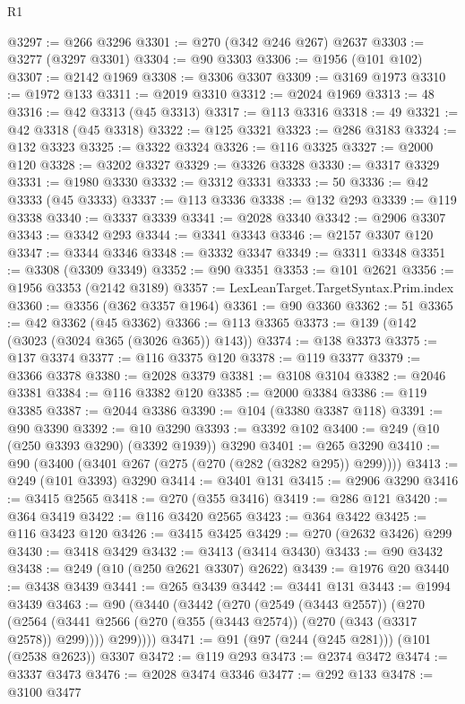 \begin{lexlean}{R1}
\begin{coremodule}
@3297 := @266 @3296
@3301 := @270 (@342 @246 @267) @2637
@3303 := @3277 (@3297 @3301)
@3304 := @90 @3303
@3306 := @1956 (@101 @102)
@3307 := @2142 @1969
@3308 := @3306 @3307
@3309 := @3169 @1973
@3310 := @1972 @133
@3311 := @2019 @3310
@3312 := @2024 @1969
@3313 := 48
@3316 := @42 @3313 (@45 @3313)
@3317 := @113 @3316
@3318 := 49
@3321 := @42 @3318 (@45 @3318)
@3322 := @125 @3321
@3323 := @286 @3183
@3324 := @132 @3323
@3325 := @3322 @3324
@3326 := @116 @3325
@3327 := @2000 @120
@3328 := @3202 @3327
@3329 := @3326 @3328
@3330 := @3317 @3329
@3331 := @1980 @3330
@3332 := @3312 @3331
@3333 := 50
@3336 := @42 @3333 (@45 @3333)
@3337 := @113 @3336
@3338 := @132 @293
@3339 := @119 @3338
@3340 := @3337 @3339
@3341 := @2028 @3340
@3342 := @2906 @3307
@3343 := @3342 @293
@3344 := @3341 @3343
@3346 := @2157 @3307 @120
@3347 := @3344 @3346
@3348 := @3332 @3347
@3349 := @3311 @3348
@3351 := @3308 (@3309 @3349)
@3352 := @90 @3351
@3353 := @101 @2621
@3356 := @1956 @3353 (@2142 @3189)
@3357 := LexLeanTarget.TargetSyntax.Prim.index
@3360 := @3356 (@362 @3357 @1964)
@3361 := @90 @3360
@3362 := 51
@3365 := @42 @3362 (@45 @3362)
@3366 := @113 @3365
@3373 := @139 (@142 (@3023 (@3024 @365 (@3026 @365)) @143))
@3374 := @138 @3373
@3375 := @137 @3374
@3377 := @116 @3375 @120
@3378 := @119 @3377
@3379 := @3366 @3378
@3380 := @2028 @3379
@3381 := @3108 @3104
@3382 := @2046 @3381
@3384 := @116 @3382 @120
@3385 := @2000 @3384
@3386 := @119 @3385
@3387 := @2044 @3386
@3390 := @104 (@3380 @3387 @118)
@3391 := @90 @3390
@3392 := @10 @3290
@3393 := @3392 @102
@3400 := @249 (@10 (@250 @3393 @3290) (@3392 @1939)) @3290
@3401 := @265 @3290
@3410 := @90 (@3400 (@3401 @267 (@275 (@270 (@282 (@3282 @295)) @299))))
@3413 := @249 (@101 @3393) @3290
@3414 := @3401 @131
@3415 := @2906 @3290
@3416 := @3415 @2565
@3418 := @270 (@355 @3416)
@3419 := @286 @121
@3420 := @364 @3419
@3422 := @116 @3420 @2565
@3423 := @364 @3422
@3425 := @116 @3423 @120
@3426 := @3415 @3425
@3429 := @270 (@2632 @3426) @299
@3430 := @3418 @3429
@3432 := @3413 (@3414 @3430)
@3433 := @90 @3432
@3438 := @249 (@10 (@250 @2621 @3307) @2622)
@3439 := @1976 @20
@3440 := @3438 @3439
@3441 := @265 @3439
@3442 := @3441 @131
@3443 := @1994 @3439
@3463 := @90
    (@3440
      (@3442
        (@270
          (@2549 (@3443 @2557))
          (@270
            (@2564 (@3441 @2566 (@270 (@355 (@3443 @2574)) (@270 (@343 (@3317 @2578)) @299))))
            @299))))
@3471 := @91 (@97 (@244 (@245 @281))) (@101 (@2538 @2623)) @3307
@3472 := @119 @293
@3473 := @2374 @3472
@3474 := @3337 @3473
@3476 := @2028 @3474 @3346
@3477 := @292 @133
@3478 := @3100 @3477

\end{coremodule}
\end{lexlean}
